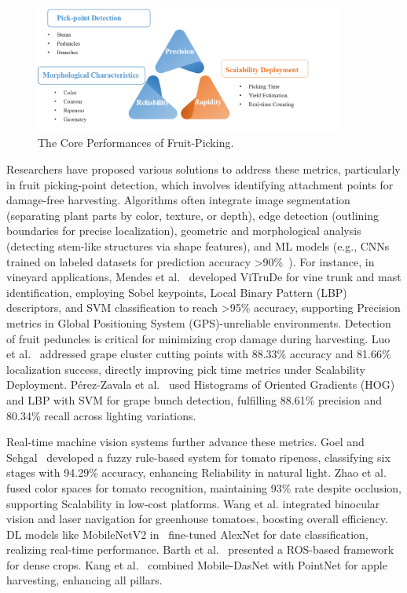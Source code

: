 \documentclass[pdflatex,sn-mathphys-num]{sn-jnl}
\begin{document}
\begin{figure}[hbtp]
\centering
\includegraphics[width=0.9\textwidth]{fig_performance.png}
\caption{The Core Performances of Fruit-Picking.}
\label{fig:performance}
\end{figure}

Researchers have proposed various solutions to address these metrics, particularly in fruit picking-point detection, which involves identifying attachment points for damage-free harvesting. Algorithms often integrate image segmentation (separating plant parts by color, texture, or depth), edge detection (outlining boundaries for precise localization), geometric and morphological analysis (detecting stem-like structures via shape features), and ML models (e.g., CNNs trained on labeled datasets for prediction accuracy >90\%~\cite{mendes2016vine}).
For instance, in vineyard applications, Mendes et al.~\cite{mendes2016vine} developed ViTruDe for vine trunk and mast identification, employing Sobel keypoints, Local Binary Pattern (LBP) descriptors, and SVM classification to reach >95\% accuracy, supporting Precision metrics in  Global Positioning System (GPS)-unreliable environments.
Detection of fruit peduncles is critical for minimizing crop damage during harvesting. 
Luo et al.~\cite{luo2018vision} addressed grape cluster cutting points with 88.33\% accuracy and 81.66\% localization success, directly improving pick time metrics under Scalability Deployment.
Pérez-Zavala et al.~\cite{perez2018pattern} used Histograms of Oriented Gradients (HOG) and LBP with SVM for grape bunch detection, fulfilling 88.61\% precision and 80.34\% recall across lighting variations.

Real-time machine vision systems further advance these metrics. 
Goel and Sehgal~\cite{goel2015fuzzy} developed a fuzzy rule-based system for tomato ripeness, classifying six stages with 94.29\% accuracy, enhancing Reliability in natural light. 
Zhao et al.~\cite{zhao2016robust} fused color spaces for tomato recognition, maintaining 93\% rate despite occlusion, supporting Scalability in low-cost platforms.
Wang et al.\cite{lili2017development} integrated binocular vision and laser navigation for greenhouse tomatoes, boosting overall efficiency.
DL models like MobileNetV2 in~\cite{altaheri2019date} fine-tuned AlexNet for date classification, realizing real-time performance. 
Barth et al.~\cite{barth2016design} presented a ROS-based framework for dense crops.
Kang et al.~\cite{kang2020real}  combined Mobile-DasNet with PointNet for apple harvesting, enhancing all pillars.
\end{document}
